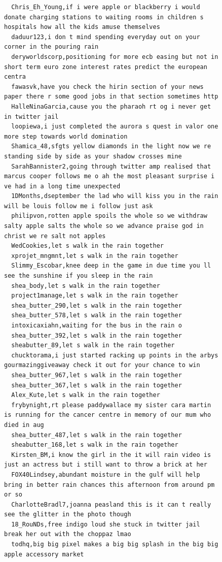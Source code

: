 \begin{figure}[htpb]
\begin{verbatim}
  Chris_Eh_Young,if i were apple or blackberry i would donate charging stations to waiting rooms in children s hospitals how all the kids amuse themselves
  daduur123,i don t mind spending everyday out on your corner in the pouring rain
  deryworldscorp,positioning for more ecb easing but not in short term euro zone interest rates predict the european centra
  fawasvk,have you check the hirin section of your news paper there r some good jobs in that section sometimes http
  HalleNinaGarcia,cause you the pharaoh rt og i never get in twitter jail
  loopiewa,i just completed the aurora s quest in valor one more step towards world domination
  Shamica_48,sfgts yellow diamonds in the light now we re standing side by side as your shadow crosses mine
  SarahBannister2,going through twitter amp realised that marcus cooper follows me o ah the most pleasant surprise i ve had in a long time unexpected
  1DMonths,dseptember the lad who will kiss you in the rain will be louis follow me i follow just ask
  philipvon,rotten apple spoils the whole so we withdraw salty apple salts the whole so we advance praise god in christ we re salt not apples
  WedCookies,let s walk in the rain together
  xprojet_mngmnt,let s walk in the rain together
  Slimmy_Escobar,knee deep in the game in due time you ll see the sunshine if you sleep in the rain
  shea_body,let s walk in the rain together
  project1manage,let s walk in the rain together
  shea_butter_290,let s walk in the rain together
  shea_butter_578,let s walk in the rain together
  intoxicaxiahn,waiting for the bus in the rain o
  shea_butter_392,let s walk in the rain together
  sheabutter_89,let s walk in the rain together
  chucktorama,i just started racking up points in the arbys gourmazinggiveaway check it out for your chance to win
  shea_butter_967,let s walk in the rain together
  shea_butter_367,let s walk in the rain together
  Alex_Kute,let s walk in the rain together
  frybynight,rt please paddywallace my sister cara martin is running for the cancer centre in memory of our mum who died in aug
  shea_butter_487,let s walk in the rain together
  sheabutter_168,let s walk in the rain together
  Kirsten_BM,i know the girl in the it will rain video is just an actress but i still want to throw a brick at her
  FOX40Lindsey,abundant moisture in the gulf will help bring in better rain chances this afternoon from around pm or so
  CharlotteBradl7,joanna peasland this is it can t really see the glitter in the photo though
  18_RouNDs,free indigo loud she stuck in twitter jail break her out with the choppaz lmao
  todhq,big big pixel makes a big big splash in the big big apple accessory market

\end{verbatim}
\end{figure}
